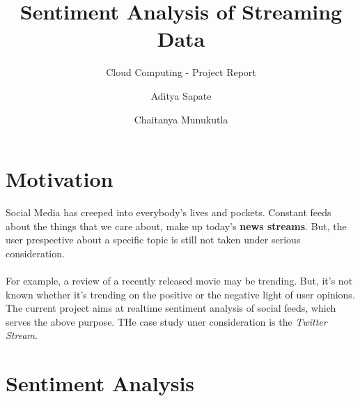 \documentclass{llncs}
\begin{document}
\title{Sentiment Analysis of Streaming Data}


\subtitle{Cloud Computing - Project Report}


\author{Aditya Sapate \and Chaitanya Munukutla}







\maketitle

\section{Motivation}
Social Media has creeped into everybody's lives and pockets. Constant feeds about the things that we care about, make up today's \textbf{news streams}. But, the user prespective about a specific topic is still not taken under serious consideration. \\ \\ For example, a review of a recently released movie may be trending. But, it's not known whether it's trending on the positive or the negative light of user opinions. The current project aims at realtime sentiment analysis of social feeds, which serves the above purpose. THe case study uner consideration is the \emph{Twitter Stream}.


\section{Sentiment Analysis}
\end{document}
